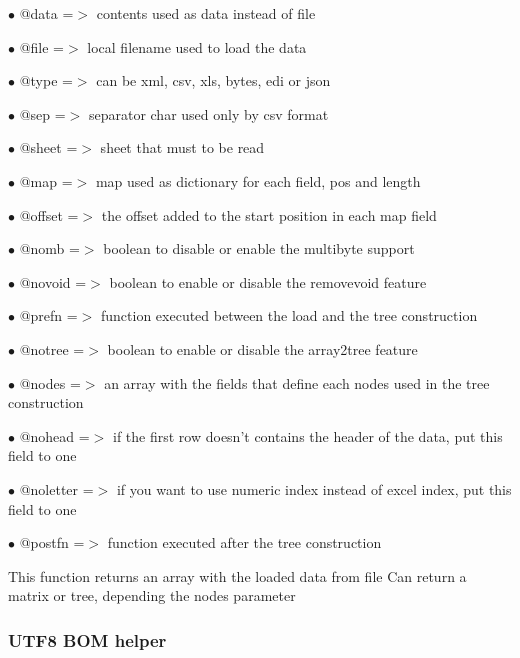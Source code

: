 \documentclass[a4paper]{article}
\begin{document}
\begin{compactitem}
\item[\color{myblue}$\bullet$] @data     =$>$ contents used as data instead of file
\item[\color{myblue}$\bullet$] @file     =$>$ local filename used to load the data
\item[\color{myblue}$\bullet$] @type     =$>$ can be xml, csv, xls, bytes, edi or json
\item[\color{myblue}$\bullet$] @sep      =$>$ separator char used only by csv format
\item[\color{myblue}$\bullet$] @sheet    =$>$ sheet that must to be read
\item[\color{myblue}$\bullet$] @map      =$>$ map used as dictionary for each field, pos and length
\item[\color{myblue}$\bullet$] @offset   =$>$ the offset added to the start position in each map field
\item[\color{myblue}$\bullet$] @nomb     =$>$ boolean to disable or enable the multibyte support
\item[\color{myblue}$\bullet$] @novoid   =$>$ boolean to enable or disable the removevoid feature
\item[\color{myblue}$\bullet$] @prefn    =$>$ function executed between the load and the tree construction
\item[\color{myblue}$\bullet$] @notree   =$>$ boolean to enable or disable the array2tree feature
\item[\color{myblue}$\bullet$] @nodes    =$>$ an array with the fields that define each nodes used in the tree construction
\item[\color{myblue}$\bullet$] @nohead   =$>$ if the first row doesn't contains the header of the data, put this field to one
\item[\color{myblue}$\bullet$] @noletter =$>$ if you want to use numeric index instead of excel index, put this field to one
\item[\color{myblue}$\bullet$] @postfn   =$>$ function executed after the tree construction
\end{compactitem}

This function returns an array with the loaded data from file
Can return a matrix or tree, depending the nodes parameter

\hypertarget{toc463}{}
\subsubsection{UTF8 BOM helper}
\end{document}
